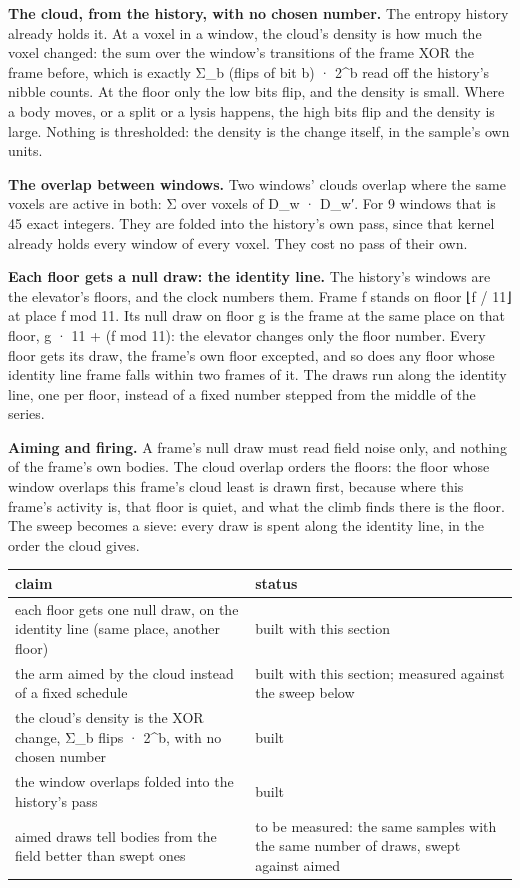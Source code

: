 \textbf{The cloud, from the history, with no chosen number.} The entropy history already holds it. At a voxel in a window, the cloud's density is how much the voxel changed: the sum over the window's transitions of the frame XOR the frame before, which is exactly Σ\_\allowbreak{}b (flips of bit b) · 2\textasciicircum{}b read off the history's nibble counts. At the floor only the low bits flip, and the density is small. Where a body moves, or a split or a lysis happens, the high bits flip and the density is large. Nothing is thresholded: the density is the change itself, in the sample's own units.

\textbf{The overlap between windows.} Two windows' clouds overlap where the same voxels are active in both: Σ over voxels of D\_\allowbreak{}w · D\_\allowbreak{}w′. For 9 windows that is 45 exact integers. They are folded into the history's own pass, since that kernel already holds every window of every voxel. They cost no pass of their own.

\textbf{Each floor gets a null draw: the identity line.} The history's windows are the elevator's floors, and the clock numbers them. Frame f stands on floor ⌊f / 11⌋ at place f mod 11. Its null draw on floor g is the frame at the same place on that floor, g · 11 + (f mod 11): the elevator changes only the floor number. Every floor gets its draw, the frame's own floor excepted, and so does any floor whose identity line frame falls within two frames of it. The draws run along the identity line, one per floor, instead of a fixed number stepped from the middle of the series.

\textbf{Aiming and firing.} A frame's null draw must read field noise only, and nothing of the frame's own bodies. The cloud overlap orders the floors: the floor whose window overlaps this frame's cloud least is drawn first, because where this frame's activity is, that floor is quiet, and what the climb finds there is the floor. The sweep becomes a sieve: every draw is spent along the identity line, in the order the cloud gives.

{\small
\setlength{\tabcolsep}{6pt}
\begin{longtable}{>{\RaggedRight\arraybackslash}p{}>{\RaggedRight\arraybackslash}p{}}
\toprule
claim & status \\
\midrule
\endhead
each floor gets one null draw, on the identity line (same place, another floor) & built with this section \\
the arm aimed by the cloud instead of a fixed schedule & built with this section; measured against the sweep below \\
the cloud's density is the XOR change, Σ\_\allowbreak{}b flips · 2\textasciicircum{}b, with no chosen number & built \\
the window overlaps folded into the history's pass & built \\
aimed draws tell bodies from the field better than swept ones & to be measured: the same samples with the same number of draws, swept against aimed \\
\bottomrule
\end{longtable}
}
